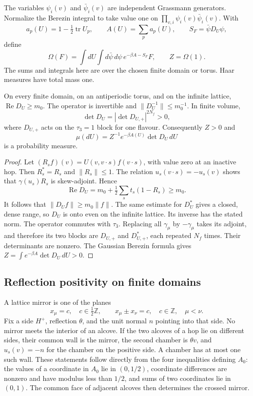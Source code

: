 \documentclass[11pt,letterpaper,reqno]{amsart}
\makeatletter
\theoremstyle{definition}
\newcommand{\ms@minorstart}{%
  \pushQED{\qed}\renewcommand{\qedsymbol}{$\blacksquare$}}
\newenvironment{proposition}[1][]{\ms@minorstart\ms@proposition[#1]}
  {\popQED\endms@proposition}
\theoremstyle{remark}
\makeatother
\begin{document}
The variables $\psi_i(v)$ and $\bar\psi_i(v)$ are independent
Grassmann generators. Normalize the Berezin integral to take value
one on $\prod_{v,i}\psi_i(v)\bar\psi_i(v)$. With
\[
 a_p(U)=1-\tfrac12\operatorname{tr}U_p,\qquad
 A(U)=\sum_pa_p(U),\qquad S_F=\bar\psi D_U\psi,
\]
define
\[
 \Omega(F)=\int dU\int d\bar\psi\,d\psi\,
                 e^{-\beta A-S_F}F,\qquad Z=\Omega(1).
\]
The sums and integrals here are over the chosen finite domain or
torus. Haar measures have total mass one.

\begin{proposition}[The determinant and the massive inverse]
\label{C-391-16}
On every finite domain, on an antiperiodic torus, and on the infinite
lattice, $\operatorname{Re}D_U\ge m_0$.
The operator is invertible and $\|D_U^{-1}\|\le m_0^{-1}$.
In finite volume,
\[
 \det D_U=|\det D_{U,+}|^{2N_f}>0,
\]
where $D_{U,+}$ acts on the $\tau_3=1$ block for one flavour.
Consequently $Z>0$ and
\[
 \mu(dU)=Z^{-1}e^{-\beta A(U)}\det D_U\,dU
\]
is a probability measure.
\end{proposition}

\begin{proof}
Let $(R_sf)(v)=U(v,v\cdot s)f(v\cdot s)$, with value zero at
an inactive hop. Then $R_s^*=R_s$ and $\|R_s\|\le1$.
The relation $u_s(v\cdot s)=-u_s(v)$ shows that
$\gamma(u_s)R_s$ is skew-adjoint. Hence
\[
 \operatorname{Re}D_U
       =m_0+\tfrac12\sum_st_s(1-R_s)\ge m_0.
\]
It follows that $\|D_Uf\|\ge m_0\|f\|$. The same estimate
for $D_U^*$ gives a closed, dense range, so $D_U$ is onto even
on the infinite lattice. Its inverse has the stated norm.
The operator commutes with $\tau_3$. Replacing all $\gamma_\mu$
by $-\gamma_\mu$ takes its adjoint, and therefore its two blocks
are $D_{U,+}$ and $D_{U,+}^*$, each repeated $N_f$ times.
Their determinants are nonzero. The Gaussian Berezin formula gives
$Z=\int e^{-\beta A}\det D_U\,dU>0$.
\end{proof}

\subsection{Reflection positivity on finite domains}

A lattice mirror is one of the planes
\[
 x_\mu=c,\quad c\in\tfrac12\mathbb Z,
 \qquad x_\mu\pm x_\nu=c,\quad c\in\mathbb Z,
 \quad \mu<\nu.
\]
Fix a side $H^+$, reflection $\theta$, and the unit normal $n$
pointing into that side. No mirror meets the interior of an alcove.
If the two alcoves of a hop lie on different sides, their common
wall is the mirror, the second chamber is $\theta v$, and
$u_s(v)=-n$ for the chamber on the positive side. A chamber
has at most one such wall. These statements follow directly from
the four inequalities defining $A_0$: the values of a coordinate
in $A_0$ lie in $(0,1/2)$, coordinate differences are nonzero and
have modulus less than $1/2$, and sums of two coordinates lie in
$(0,1)$. The common face of adjacent alcoves then determines the
crossed mirror.
\end{document}
